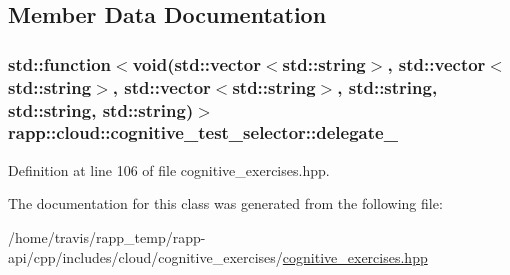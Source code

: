 \subsection{Member Data Documentation}
\hypertarget{classrapp_1_1cloud_1_1cognitive__test__selector_ac6700af12c9cb0ebcd7b88005d7b0257}{
\subsubsection[{delegate\-\_\-}]{\setlength{\rightskip}{0pt plus 5cm}std\-::function$<$void(std\-::vector$<$std\-::string$>$, std\-::vector$<$std\-::string$>$, std\-::vector$<$std\-::string$>$, std\-::string, std\-::string, std\-::string)$>$ rapp\-::cloud\-::cognitive\-\_\-test\-\_\-selector\-::delegate\-\_\-\hspace{0.3cm}{\ttfamily [private]}}}\label{classrapp_1_1cloud_1_1cognitive__test__selector_ac6700af12c9cb0ebcd7b88005d7b0257}


Definition at line 106 of file cognitive\-\_\-exercises.\-hpp.



The documentation for this class was generated from the following file\-:\begin{DoxyCompactItemize}
\item 
/home/travis/rapp\-\_\-temp/rapp-\/api/cpp/includes/cloud/cognitive\-\_\-exercises/\hyperlink{cognitive__exercises_8hpp}{cognitive\-\_\-exercises.\-hpp}\end{DoxyCompactItemize}
